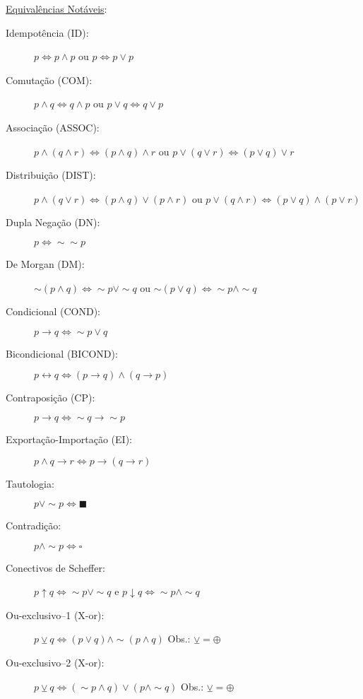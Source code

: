 \documentclass[12pt]{article}
\begin{document}
\underline{Equivalências Notáveis}:
\begin{description}
\item[Idempotência (ID):] $p\Leftrightarrow p\wedge p$ ou $p\Leftrightarrow p\vee p$
\item[Comutação (COM):] $p\wedge q\Leftrightarrow q\wedge p$ ou $p\vee q\Leftrightarrow q\vee p$
\item[Associação (ASSOC):] $p\wedge(q\wedge r)\Leftrightarrow (p\wedge q)\wedge r$ ou $p\vee(q\vee r)\Leftrightarrow (p\vee q)\vee r$ 
\item[Distribuição (DIST):] $p\wedge(q\vee r)\Leftrightarrow (p\wedge q)\vee (p \wedge r)$ ou $p\vee(q\wedge r)\Leftrightarrow (p\vee q)\wedge (p\vee r)$
\item[Dupla Negação (DN):] $p\Leftrightarrow\sim\sim p$
\item[De Morgan (DM):] $\sim(p \wedge q) \Leftrightarrow \sim p \vee\sim q$ ou $\sim(p \vee q) \Leftrightarrow \sim p \wedge\sim q$
\item[Condicional (COND):] $p\rightarrow q \Leftrightarrow\sim p \vee q$

\item[Bicondicional (BICOND):] $p\leftrightarrow q \Leftrightarrow (p\rightarrow q)\wedge(q\rightarrow p)$

\item[Contraposição (CP):] $p\rightarrow q \Leftrightarrow \sim q\rightarrow\sim p$

\item[Exportação-Importação (EI):] $p\wedge q\rightarrow r \Leftrightarrow p\rightarrow(q\rightarrow r)$

\item[Tautologia:] $p\vee \sim p \Leftrightarrow  \blacksquare  $

\item[Contradição:] $ p\wedge \sim p \Leftrightarrow \square $

\item[Conectivos de Scheffer:] $p \uparrow q \Leftrightarrow \sim p \vee \sim q$ e $p \downarrow q \Leftrightarrow \sim p \wedge \sim q$ 

\item[Ou-exclusivo--1 (X-or):] $p \veebar q \Leftrightarrow (p \vee q) \wedge\sim (p \wedge q)$ Obs.: $\veebar = \oplus$

\item[Ou-exclusivo--2 (X-or):] $p \veebar q \Leftrightarrow (\sim p \wedge q) \vee (p \wedge \sim q)$ Obs.: $\veebar = \oplus$

\end{description}
%
\end{document}
